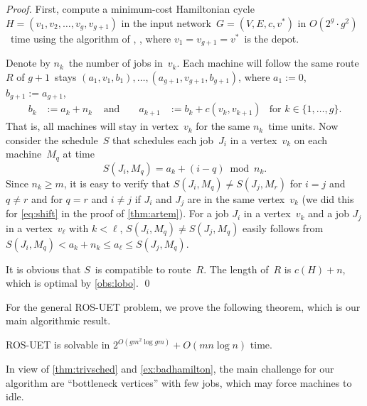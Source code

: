 \documentclass[natbib,sort,smallextended,envcountsame,envcountsect,numbook]{svjour3}
\newcommand{\HC}{H}
\newcommand{\bigO}{O}
\newcommand{\ROSUPT}{\textsc{ROS-UET}}
\newcommand{\nmach}{m}
\newcommand{\nverts}{g}
\newcommand{\jobsin}[1]{n_{#1}}
\newcommand{\Gr}{G}
\begin{document}
\begin{proof}
  First, compute a minimum-cost Hamiltonian cycle~\(\HC=(v_1,v_2,\dots,v_{\nverts},v_{\nverts+1})\)
  in the input network~\(\Gr=(V,E,c,v^*)\) in \(\bigO(2^{\nverts}\cdot\nverts^2)\)~time
  using the algorithm of \citet{Bell62}, \citet{HelK62},
  where \(v_1=v_{\nverts+1}=v^*\)~is the depot.

  Denote by \(n_k\)~the number of jobs in~\(v_k\).
  Each machine will follow the same route~$R$
  of $\nverts+1$~stays $(a_1,v_1,b_1),\dots,\allowbreak (a_{\nverts+1},v_{\nverts+1},b_{\nverts+1})$,  where \(a_1:=0\), \(b_{\nverts+1}:=a_{\nverts+1}\),
  \begin{align*}
    b_{k}&:=a_{k}+n_k&\text{ and }&&
    a_{k+1} &:= b_{k}+c(v_k,v_{k+1}) &\text{for $k\in\{1,\dots,\nverts\}$}.
  \end{align*}
  That is, all machines will stay in vertex~\(v_k\) for the same \(n_k\)~time units.
  Now consider the schedule~\(S\) that
  schedules each job~\(J_i\) in a vertex~\(v_k\)
  on each machine~\(M_q\) at time
  \[
    S(J_i,M_q)=a_k+(i-q)\bmod n_k.
  \]
  Since \(n_k\geq m\), it is easy to verify
  that \(S(J_i,M_q)\ne S(J_j,M_r)\)
  for \(i=j\) and \(q\ne r\)
  and for \(q=r\) and \(i\ne j\) if \(J_i\) and \(J_j\) are in the same vertex~\(v_k\)
  (we did this for \eqref{eq:shift} in the proof of \cref{thm:artem}).
  For a job \(J_i\) in a vertex~\(v_k\)
  and a job \(J_j\) in a vertex~\(v_\ell\)
  with \(k< \ell\), \(S(J_i,M_q)\ne S(J_j,M_q)\)
  easily follows 
  from \(S(J_i,M_q)< a_k+n_k\leq a_\ell\leq S(J_j,M_q)\).

  It is obvious that \(S\)~is compatible to route~\(R\).
  The length of~\(R\) is \(c(H)+n\), which is optimal by \cref{obs:lobo}.
  \qed
\end{proof}

\noindent
For the general \ROSUPT{} problem, we prove the following theorem,
which is our main algorithmic result.

\begin{theorem}\label{thm:ros-fpt}
  \ROSUPT{} is solvable in \(2^{\bigO(\nverts\nmach^2\log\nverts\nmach)}+O(mn\log n)\text{ time.}\)
\end{theorem}

\noindent
In view of \cref{thm:trivsched} and \cref{ex:badhamilton},
the main challenge for our algorithm
are ``bottleneck vertices'' with few jobs,
which may force machines to idle.
\end{document}
